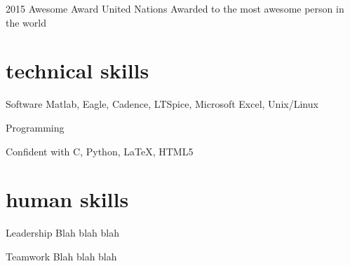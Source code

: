 \documentclass[]{friggeri-cv} %
\begin{document}
\begin{entrylist}


\entry
{2015}
{Awesome Award}
{United Nations} 
{} 
{Awarded to the most awesome person in the world}



\end{entrylist}


\section{technical skills}

\begin{entrylist}




\entry
{}
{Software}
{}
{}
{
Matlab, Eagle, Cadence, LTSpice, Microsoft Excel, Unix/Linux
}



\entry
{}
{Programming}
{}
{}
{
Confident with C, Python, \LaTeX, HTML5

}




\end{entrylist}




\section{human skills}

\begin{entrylist}




\entry
{}
{Leadership}
{}
{}
{
Blah blah blah
}



\entry
{}
{Teamwork}
{}
{}
{
Blah blah blah
}




\end{entrylist}
\end{document}
